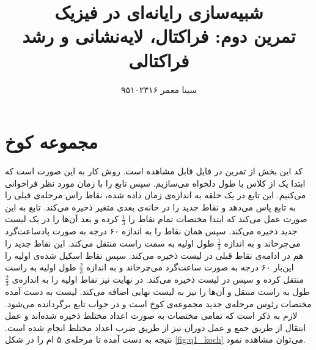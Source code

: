 \documentclass[11pt, a4paper]{article}
\title{\textbf{شبیه‌سازی رایانه‌ای در فیزیک}\\تمرین دوم: فراکتال، لایه‌نشانی و رشد فراکتالی}
\author{سینا معمر ۹۵۱۰۲۳۱۶}
\begin{document}
\maketitle
\thispagestyle{empty}


\section{\textbf{مجموعه کوخ}}
کد این بخش از تمرین در فایل
قابل مشاهده است. روش کار به این صورت است که ابتدا یک
از کلاس
با طول دلخواه می‌سازیم. سپس تابع
را با زمان مورد نظر فراخوانی می‌کنیم. این تابع در یک حلقه به اندازه‌ی زمان داده شده، نقاط راس مرحله‌ی قبلی را به تابع
پاس می‌دهد و نقاط جدید را در خانه‌ی بعدی متغیر
ذخیره می‌کند. تابع
به این صورت عمل می‌کند که ابتدا مختصات تمام نقاط را
$\frac{1}{3}$
کرده و بعد آن‌ها را در یک لیست جدید ذخیره می‌کند. سپس همان نقاط را به اندازه ۶۰ درجه به صورت پادساعت‌گرد می‌چرخاند و به اندازه 
$\frac{1}{3}$
طول اولیه به سمت راست منتقل می‌کند. این نقاط جدید را هم در ادامه‌‌ی نقاط قبلی در لیست ذخیره می‌کند. سپس نقاط اسکیل شده‌ی اولیه را این‌بار ۶۰ درجه به صورت ساعت‌گرد می‌چرخاند و به اندازه‌
$\frac{2}{3}$
طول اولیه به راست منتقل کرده و سپس در لیست ذخیره می‌کند. در نهایت نیز نقاط اولیه را به اندازه‌ی 
$\frac{2}{3}$
طول به راست منتقل و آن‌ها را نیز به لیست نهایی اضافه می‌کند. لیست به دست‌ آمده مختصات رئوس مرحله‌ی جدید مجموعه‌ی کوخ است و در جواب تابع برگردانده می‌شود. لازم به ذکر است که تمامی مختصات به صورت اعداد مختلط ذخیره شده‌اند و عمل انتقال از طریق جمع و عمل دوران نیز از طریق ضرب اعداد مختلط انجام شده است.
نتیجه به دست آمده تا مرحله‌ی ۵ ام را در شکل
\ref{fig:q1_koch}
می‌توان مشاهده نمود.
\end{document}
